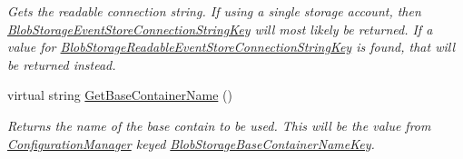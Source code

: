 \begin{DoxyCompactItemize}
\begin{DoxyCompactList}\small\item\em Gets the readable connection string. If using a single storage account, then \hyperlink{classCqrs_1_1Azure_1_1BlobStorage_1_1Events_1_1BlobStorageEventStoreConnectionStringFactory_a36edb24cf0ef60114fc344b5d0bb619d_a36edb24cf0ef60114fc344b5d0bb619d}{Blob\+Storage\+Event\+Store\+Connection\+String\+Key} will most likely be returned. If a value for \hyperlink{classCqrs_1_1Azure_1_1BlobStorage_1_1Events_1_1BlobStorageEventStoreConnectionStringFactory_a2b233edf7ad4cbc29872757006319527_a2b233edf7ad4cbc29872757006319527}{Blob\+Storage\+Readable\+Event\+Store\+Connection\+String\+Key} is found, that will be returned instead. \end{DoxyCompactList}\item 
virtual string \hyperlink{classCqrs_1_1Azure_1_1BlobStorage_1_1Events_1_1BlobStorageEventStoreConnectionStringFactory_a0e6aadced9c9a583884899a4c9de2f1a_a0e6aadced9c9a583884899a4c9de2f1a}{Get\+Base\+Container\+Name} ()
\begin{DoxyCompactList}\small\item\em Returns the name of the base contain to be used. This will be the value from \hyperlink{namespaceCqrs_1_1Azure_1_1ConfigurationManager}{Configuration\+Manager} keyed \hyperlink{classCqrs_1_1Azure_1_1BlobStorage_1_1Events_1_1BlobStorageEventStoreConnectionStringFactory_affd6198f87e483bd7a6f5930a5eaa431_affd6198f87e483bd7a6f5930a5eaa431}{Blob\+Storage\+Base\+Container\+Name\+Key}. \end{DoxyCompactList}\end{DoxyCompactItemize}
